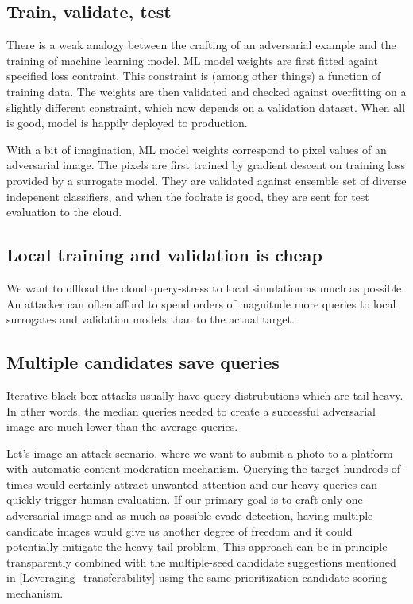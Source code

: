 \subsection{Train, validate, test}
There is a weak analogy between the crafting of an adversarial example and the training of machine learning model. ML model weights are first fitted againt specified loss contraint. This constraint is (among other things) a function of training data. The weights are then validated and checked against overfitting on a slightly different constraint, which now depends on a validation dataset. When all is good, model is happily deployed to production.

With a bit of imagination, ML model weights correspond to pixel values of an adversarial image. The pixels are first trained by gradient descent on training loss provided by a surrogate model. They are validated against ensemble set of diverse indepenent classifiers, and when the foolrate is good, they are sent for test evaluation to the cloud. 

\subsection{Local training and validation is cheap}
We want to offload the cloud query-stress to local simulation as much as possible. An attacker can often afford to spend orders of magnitude more queries to local surrogates and validation models than to the actual target.

\subsection{Multiple candidates save queries}
Iterative black-box attacks usually have query-distrubutions which are tail-heavy. In other words, the median queries needed to create a successful adversarial image are much lower than the average queries.

Let's image an attack scenario, where we want to submit a photo to a platform with automatic content moderation mechanism. Querying the target hundreds of times would certainly attract unwanted attention and our heavy queries can quickly trigger human evaluation. If our primary goal is to craft only one adversarial image and as much as possible evade detection, having multiple candidate images would give us another degree of freedom and it could potentially mitigate the heavy-tail problem. This approach can be in principle transparently combined with the multiple-seed candidate suggestions mentioned in \ref{Leveraging_transferability} using the same prioritization candidate scoring mechanism.


